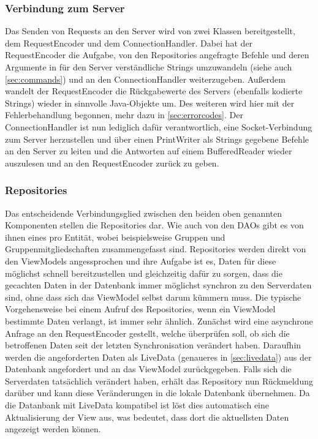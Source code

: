 \documentclass[parskip=full,11pt]{scrartcl}
\begin{document}
\subsubsection{Verbindung zum Server}
Das Senden von Requests an den Server wird von zwei Klassen bereitgestellt, dem
RequestEncoder und dem ConnectionHandler. Dabei hat der RequestEncoder die
Aufgabe, von den Repositories angefragte Befehle und deren Argumente in für den
Server verständliche Strings umzuwandeln (siehe auch \ref{sec:commands}) und an
den ConnectionHandler weiterzugeben. Außerdem wandelt der
RequestEncoder die Rückgabewerte des Servers (ebenfalls kodierte Strings)
wieder in sinnvolle Java-Objekte um. Des weiteren wird hier mit der
Fehlerbehandlung begonnen, mehr dazu in \ref{sec:errorcodes}. Der ConnectionHandler
ist nun lediglich
dafür verantwortlich, eine Socket-Verbindung zum Server herzustellen und über
einen PrintWriter als Strings gegebene Befehle an den Server zu leiten und die
Antworten auf einem BufferedReader wieder auszulesen und an den RequestEncoder
zurück zu geben.

\subsubsection{Repositories}

Das entscheidende Verbindungsglied zwischen den beiden oben genannten
Komponenten stellen die Repositories dar. Wie auch von den DAOs gibt es von
ihnen eines pro Entität, wobei beispielsweise Gruppen und
Gruppenmitgliedschaften zusammengefasst sind. Repositories werden
direkt von den ViewModels angessprochen und ihre Aufgabe ist es, Daten für diese
möglichst schnell bereitzustellen und gleichzeitig dafür zu sorgen, dass die
gecachten Daten in der Datenbank immer möglichst synchron zu den Serverdaten
sind, ohne dass sich das ViewModel selbst darum kümmern muss. Die typische
Vorgehensweise bei einem Aufruf des Repositories, wenn ein ViewModel bestimmte
Daten verlangt, ist immer sehr ähnlich. Zunächst wird eine asynchrone Anfrage
an den RequestEncoder gestellt, welche überprüfen soll, ob sich die betroffenen
Daten seit der letzten Synchronisation verändert haben. Daraufhin werden die
angeforderten Daten als LiveData (genaueres in \ref{sec:livedata}) aus der
Datenbank angefordert und an das
ViewModel zurückgegeben. Falls sich die Serverdaten tatsächlich verändert
haben, erhält das Repository nun Rückmeldung darüber und kann diese
Veränderungen in die lokale Datenbank übernehmen. Da die Datanbank mit LiveData
kompatibel ist löst dies automatisch eine Aktualisierung der View aus, was
bedeutet, dass dort die aktuellsten Daten angezeigt werden können.
\end{document}
